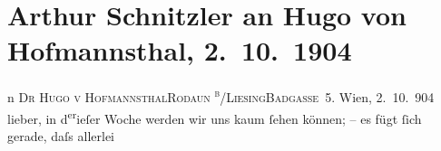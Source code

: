 

         
         \renewcommand{\erwaehntePersonen}{Personen: Eleonora Duse, Georges Feydeau, Hugo von Hofmannsthal}
         \renewcommand{\erwaehnteInstitutionen}{Institutionen: Theater an der Wien}
         \renewcommand{\erwaehnteOrte}{Orte: Badgasse, Burgtheater, Rodaun, Theater in der Josefstadt, Wien, XIII., Hietzing, XVIII., Währing}
         \renewcommand{\erwaehnteWerke}{Werke: Die Kameliendame. Drama in fünf Akten, Entweder – Oder, Heinrich V., Herzogin Crevette. Schauspiel in fünf Acten, Kunst und Künstler}
               \section[Arthur Schnitzler an Hugo von Hofmannsthal, 2. 10. 1904]{ Arthur Schnitzler an Hugo von Hofmannsthal, 2. 10. 1904}\nopagebreak{}\rehead{ }\begin{ledgroupsized}[t]{13cm}\normalsize\beginnumbering \toendnotes[C]{\smallbreak\pagebreak[2]} 
\toendnotes[C]{\smallbreak}\pstart{}{\pb}n \textsc{Dr Hugo v Hofmannsthal}\pend{}\pstart{}\textsc{Rodaun \textsuperscript{b}/Liesing}\pend{}\pstart{}\textsc{Badgasse 5}. \pend{}{\bigskip}\pstart
           \raggedleft{}{\pb}Wien, 2. 10. 904\pend
           \pstart
           lieber, in d\substVorne{}\textsuperscript{er}\substDazwischen{}ieſer\substHinten{} Woche werden wir uns kaum ſehen können; – es fügt ſich gerade, daſs allerlei

\end{ledgroupsized}
